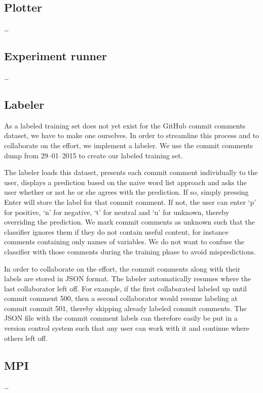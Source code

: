 \documentclass{article}
\begin{document}
\subsection{Plotter}\label{sec:plotter}
\ldots

\subsection{Experiment runner}\label{sec:experiment-runner}
\ldots

\subsection{Labeler}\label{sec:labeler}
As a labeled training set does not yet exist for the GitHub commit comments
dataset, we have to make one ourselves. In order to streamline this process
and to collaborate on the effort, we implement a labeler. We use the commit
comments dump from 29--01--2015 to create our labeled training set.

The labeler loads this dataset, presents each commit comment individually to
the user, displays a prediction based on the naive word list approach and asks
the user whether or not he or she agrees with the prediction. If so, simply
pressing Enter will store the label for that commit comment. If not, the user
can enter `p' for positive, `n' for negative, `t' for neutral and `u' for
unknown, thereby overriding the prediction. We mark commit comments as unknown
such that the classifier ignores them if they do not contain useful content,
for instance comments containing only names of variables. We do not want to
confuse the classifier with those comments during the training phase to avoid
mispredictions.

In order to collaborate on the effort, the commit comments along with their
labels are stored in JSON format. The labeler automatically resumes where
the last collaborator left off. For example, if the first collaborated labeled
up until commit comment 500, then a second collaborator would resume labeling
at commit commit 501, thereby skipping already labeled commit comments. The
JSON file with the commit comment labels can therefore easily be put in a
version control system such that any user can work with it and continue where
others left off.

\subsection{MPI}\label{sec:mpi}
\ldots
\end{document}
